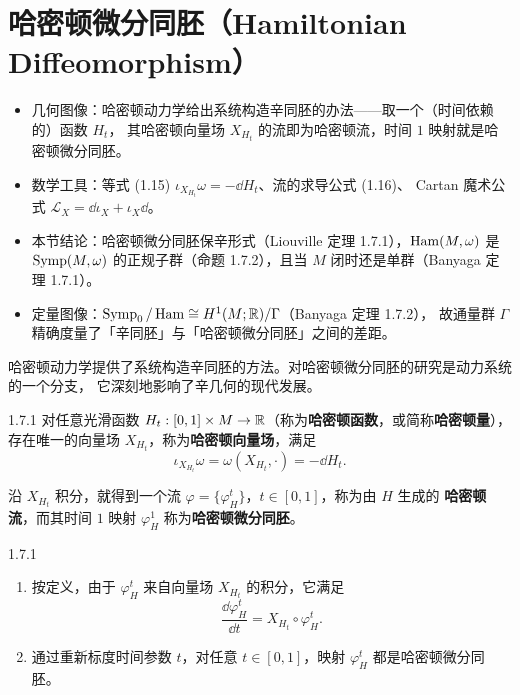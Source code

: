 \section{哈密顿微分同胚（Hamiltonian Diffeomorphism）}

\begin{keytakeaways}
\begin{itemize}
  \item 几何图像：哈密顿动力学给出系统构造辛同胚的办法——取一个（时间依赖的）函数 $H_t$，
        其哈密顿向量场 $X_{H_t}$ 的流即为哈密顿流，时间 $1$ 映射就是哈密顿微分同胚。
  \item 数学工具：等式 (1.15) $\iota_{X_{H_t}}\omega=-\dd H_t$、流的求导公式 (1.16)、
        Cartan 魔术公式 $\mathcal{L}_X=\dd\iota_X+\iota_X\dd$。
  \item 本节结论：哈密顿微分同胚保辛形式（Liouville 定理 1.7.1），$\operatorname{Ham}(M,\omega)$ 是
        $\operatorname{Symp}(M,\omega)$ 的正规子群（命题 1.7.2），且当 $M$ 闭时还是单群（Banyaga 定理 1.7.1）。
  \item 定量图像：$\operatorname{Symp}_0/\operatorname{Ham}\cong H^1(M;\mathbb{R})/\Gamma$（Banyaga 定理 1.7.2），
        故通量群 $\Gamma$ 精确度量了「辛同胚」与「哈密顿微分同胚」之间的差距。
\end{itemize}
\end{keytakeaways}

哈密顿动力学提供了系统构造辛同胚的方法。对哈密顿微分同胚的研究是动力系统的一个分支，
它深刻地影响了辛几何的现代发展。

\begin{wdefn}{1.7.1}
对任意光滑函数 $H_t:[0,1]\times M\to\mathbb{R}$（称为\textbf{哈密顿函数}，或简称\textbf{哈密顿量}），
存在唯一的向量场 $X_{H_t}$，称为\textbf{哈密顿向量场}，满足
\begin{equation}
  \iota_{X_{H_t}}\omega=\omega(X_{H_t},\cdot)=-\dd H_t .
  \tag{1.15}
\end{equation}
\end{wdefn}

沿 $X_{H_t}$ 积分，就得到一个流 $\varphi=\{\varphi_H^t\}$，$t\in[0,1]$，称为由 $H$ 生成的
\textbf{哈密顿流}，而其时间 $1$ 映射 $\varphi_H^1$ 称为\textbf{哈密顿微分同胚}。

\begin{wrem}{1.7.1}
\begin{enumerate}[label=(\roman*)]
  \item 按定义，由于 $\varphi_H^t$ 来自向量场 $X_{H_t}$ 的积分，它满足
    \begin{equation}
      \frac{\dd\varphi_H^t}{\dd t}=X_{H_t}\circ\varphi_H^t .
      \tag{1.16}
    \end{equation}
  \item 通过重新标度时间参数 $t$，对任意 $t\in[0,1]$，映射 $\varphi_H^t$ 都是哈密顿微分同胚。
\end{enumerate}
\end{wrem}

